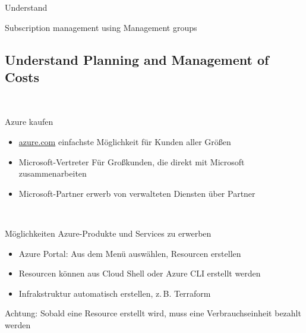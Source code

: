 \documentclass{scrartcl}
\newenvironment{flashcard}[2][]{%
    #1
    \vfill
    \centerline{\Large{#2}}
    \vfill
\newpage
}
{\newpage}
\newcommand{\subsectioncard}[1]{
    \vspace*{\stretch{1}}
    \subsection{#1}
    \vspace*{\stretch{1}}
    \pagebreak
}
\begin{document}
    \begin{flashcard}[Understand]{Subscription management using Management groups}

    \end{flashcard}

    \subsectioncard{Understand Planning and Management of Costs}

    \begin{flashcard}[\ ]{Azure kaufen}
        \begin{itemize}
            \item \href{azure.com}{azure.com}\newline
            einfachste Möglichkeit für Kunden aller Größen
            \item Microsoft-Vertreter\newline
            Für Großkunden, die direkt mit Microsoft zusammenarbeiten
            \item Microsoft-Partner\newline
            erwerb von verwalteten Diensten über Partner
        \end{itemize}
    \end{flashcard}

    \begin{flashcard}[\ ]{Möglichkeiten Azure-Produkte und Services zu erwerben}
        \begin{itemize}
            \item Azure Portal: Aus dem Menü auswählen, Resourcen erstellen
            \item Resourcen können aus Cloud Shell oder Azure CLI erstellt werden
            \item Infrakstruktur automatisch erstellen, z.\,B. Terraform
        \end{itemize}

        \vspace{5mm}
        Achtung: Sobald eine Resource erstellt wird, muss eine Verbrauchseinheit bezahlt werden
    \end{flashcard}
\end{document}

